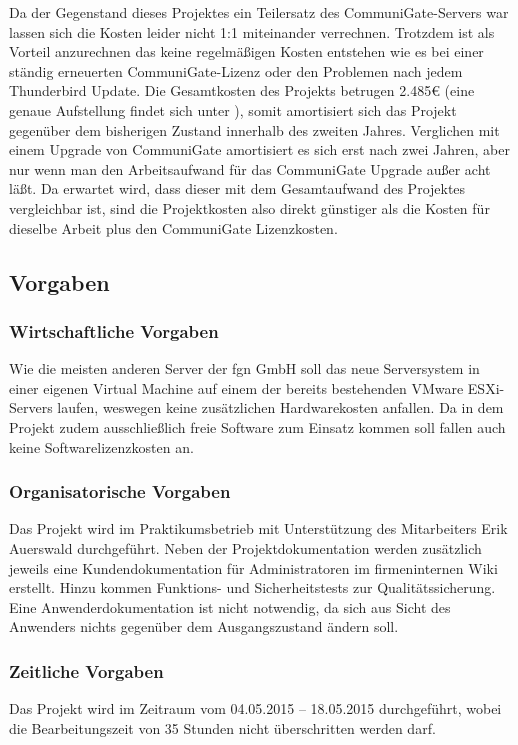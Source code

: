 \documentclass[11pt,a4paper,titlepage=firstiscover,headsepline,bibtotoc]{scrartcl} %
\begin{document}
Da der Gegenstand dieses Projektes ein Teilersatz des CommuniGate-Servers war lassen sich die Kosten leider nicht 1:1 miteinander verrechnen. Trotzdem ist als Vorteil anzurechnen das keine regelmäßigen Kosten entstehen wie es bei einer ständig erneuerten CommuniGate-Lizenz oder den Problemen nach jedem Thunderbird Update. Die Gesamtkosten des Projekts betrugen 2.485\euro{} (eine genaue Aufstellung findet sich unter ), somit amortisiert sich das Projekt gegenüber dem bisherigen Zustand innerhalb des zweiten Jahres. Verglichen mit einem Upgrade von CommuniGate amortisiert es sich erst nach zwei Jahren, aber nur wenn man den Arbeitsaufwand für das CommuniGate Upgrade außer acht läßt. Da erwartet wird, dass dieser mit dem Gesamtaufwand des Projektes vergleichbar ist, sind die Projektkosten also direkt günstiger als die Kosten für dieselbe Arbeit plus den CommuniGate Lizenzkosten.

\subsection{Vorgaben}
\subsubsection{Wirtschaftliche Vorgaben}
Wie die meisten anderen Server der fgn GmbH soll das neue Serversystem in einer eigenen Virtual Machine auf einem der bereits bestehenden VMware ESXi-Servers laufen, weswegen keine zusätzlichen Hardwarekosten anfallen. Da in dem Projekt zudem ausschließlich freie Software zum Einsatz kommen soll fallen auch keine Softwarelizenzkosten an.

\subsubsection{Organisatorische Vorgaben}
Das Projekt wird im Praktikumsbetrieb mit Unterstützung des Mitarbeiters Erik Auerswald durchgeführt.
Neben der Projektdokumentation werden zusätzlich jeweils eine Kundendokumentation für Administratoren im firmeninternen Wiki erstellt. Hinzu kommen Funktions- und Sicherheitstests zur Qualitätssicherung. Eine Anwenderdokumentation ist nicht notwendig, da sich aus Sicht des Anwenders nichts gegenüber dem Ausgangszustand ändern soll.

\subsubsection{Zeitliche Vorgaben}
Das Projekt wird im Zeitraum vom 04.05.2015 – 18.05.2015 durchgeführt, wobei die Bearbeitungszeit von 35 Stunden nicht überschritten werden darf.
\end{document}
